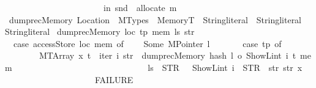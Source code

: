 \begin{isabellebody}
\ \ \ \ \ \ \ \ \ \ \ \ \ \ \ \ \ \ \ \ \ \ \ in\ {\isacharparenleft}{\kern0pt}snd\ {\isasymcirc}\ allocate{\isacharparenright}{\kern0pt}\ m{\isacharparenright}{\kern0pt}{\isachardoublequoteclose}\isanewline
\ \ \ \ \ \ \ \ \ \ \ \ \ \ \ \ \ \ \ \ \ \ \ \ \ \ \isanewline
{}\isamarkupfalse%
\ dumprec\isactrlsub M\isactrlsub e\isactrlsub m\isactrlsub o\isactrlsub r\isactrlsub y{\isacharcolon}{\kern0pt}{\isacharcolon}{\kern0pt}\ {\isachardoublequoteopen}Location\ {\isasymRightarrow}\ MTypes\ {\isasymRightarrow}\ MemoryT\ {\isasymRightarrow}\ String{\isachardot}{\kern0pt}literal\ {\isasymRightarrow}\ String{\isachardot}{\kern0pt}literal\ {\isasymRightarrow}\ String{\isachardot}{\kern0pt}literal{\isachardoublequoteclose}\ \isanewline
{\isachardoublequoteopen}dumprec\isactrlsub M\isactrlsub e\isactrlsub m\isactrlsub o\isactrlsub r\isactrlsub y\ loc\ tp\ mem\ ls\ str\ {\isacharequal}{\kern0pt}\isanewline
\ \ {\isacharparenleft}{\kern0pt}case\ accessStore\ loc\ mem\ of\isanewline
\ \ \ \ Some\ {\isacharparenleft}{\kern0pt}MPointer\ l{\isacharparenright}{\kern0pt}\ {\isasymRightarrow}\isanewline
\ \ \ \ \ \ {\isacharparenleft}{\kern0pt}case\ tp\ of\isanewline
\ \ \ \ \ \ \ \ {\isacharparenleft}{\kern0pt}MTArray\ x\ t{\isacharparenright}{\kern0pt}\ {\isasymRightarrow}\ iter\ {\isacharparenleft}{\kern0pt}{\isasymlambda}i\ str{\isacharprime}{\kern0pt}\ {\isachardot}{\kern0pt}\ dumprec\isactrlsub M\isactrlsub e\isactrlsub m\isactrlsub o\isactrlsub r\isactrlsub y\ {\isacharparenleft}{\kern0pt}{\isacharparenleft}{\kern0pt}hash\ l\ o\ ShowL\isactrlsub i\isactrlsub n\isactrlsub t{\isacharparenright}{\kern0pt}\ i{\isacharparenright}{\kern0pt}\ t\ mem\ \isanewline
\ \ \ \ \ \ \ \ \ \ \ \ \ \ \ \ \ \ \ \ \ \ \ \ \ \ \ \ \ \ {\isacharparenleft}{\kern0pt}ls\ {\isacharplus}{\kern0pt}\ {\isacharparenleft}{\kern0pt}STR\ {\isacharprime}{\kern0pt}{\isacharprime}{\kern0pt}{\isacharbrackleft}{\kern0pt}{\isacharprime}{\kern0pt}{\isacharprime}{\kern0pt}{\isacharparenright}{\kern0pt}\ {\isacharplus}{\kern0pt}\ {\isacharparenleft}{\kern0pt}ShowL\isactrlsub i\isactrlsub n\isactrlsub t\ i{\isacharparenright}{\kern0pt}\ {\isacharplus}{\kern0pt}\ {\isacharparenleft}{\kern0pt}STR\ {\isacharprime}{\kern0pt}{\isacharprime}{\kern0pt}{\isacharbrackright}{\kern0pt}{\isacharprime}{\kern0pt}{\isacharprime}{\kern0pt}{\isacharparenright}{\kern0pt}{\isacharparenright}{\kern0pt}\ str{\isacharprime}{\kern0pt}{\isacharparenright}{\kern0pt}\ str\ x\isanewline
\ \ \ \ \ \ \ \ \ \ \ \ \ \ \ \ \ \ {\isacharbar}{\kern0pt}\ {\isacharunderscore}{\kern0pt}\ {\isasymRightarrow}\ FAILURE{\isacharparenright}{\kern0pt}\isanewline

\end{isabellebody}
